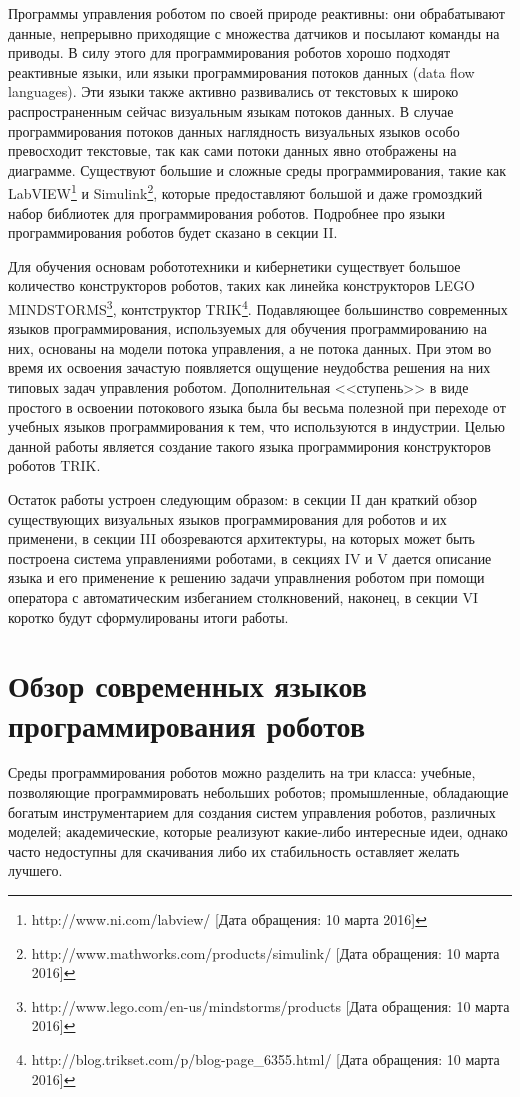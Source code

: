 \documentclass[conference]{IEEEtran}
\begin{document}
Программы управления роботом по своей природе реактивны: они обрабатывают данные, непрерывно  приходящие с множества датчиков и посылают команды на приводы. В силу этого для программирования роботов хорошо подходят реактивные языки, или языки программирования потоков данных (data flow languages). Эти языки также активно развивались от текстовых к широко распространенным сейчас визуальным языкам потоков данных\cite{johnston2004advances}. В случае программирования потоков данных наглядность визуальных языков особо превосходит текстовые, так как сами потоки данных явно отображены на диаграмме. Существуют большие и сложные среды программирования, такие как LabVIEW\footnote{http://www.ni.com/labview/ [Дата обращения: 10 марта 2016]} и Simulink\footnote{http://www.mathworks.com/products/simulink/ [Дата обращения: 10 марта 2016]}, которые предоставляют большой и даже громоздкий набор библиотек для программирования роботов. Подробнее про языки программирования роботов будет сказано в секции II.

Для обучения основам робототехники и кибернетики существует большое количество конструкторов роботов, таких как линейка конструкторов LEGO MINDSTORMS\footnote{http://www.lego.com/en-us/mindstorms/products [Дата обращения: 10 марта 2016]}, контструктор TRIK\footnote{http://blog.trikset.com/p/blog-page\_6355.html/ [Дата обращения: 10 марта 2016]}.
Подавляющее большинство современных языков программирования, используемых для обучения программированию на них, основаны на модели потока управления, а не потока данных. При этом во время их освоения зачастую появляется ощущение неудобства решения на них типовых задач управления роботом. Дополнительная <<ступень>> в виде простого в освоении потокового языка была бы весьма полезной при переходе от учебных языков программирования к тем, что используются в индустрии. Целью данной работы является создание такого языка программирония конструкторов роботов TRIK.


Остаток работы устроен следующим образом: в секции II дан краткий обзор существующих визуальных языков программирования для роботов и их применени, в секции III обозреваются архитектуры, на которых может быть построена система управлениями роботами, в секциях IV и V дается описание языка и его применение к решению задачи управлнения роботом при помощи оператора с автоматическим избеганием столкновений, наконец, в секции VI коротко будут сформулированы итоги работы. 

\section{Обзор современных языков программирования роботов}
Среды программирования роботов можно разделить на три класса: учебные, позволяющие программировать небольших роботов; промышленные, обладающие богатым инструментарием для создания систем управления роботов, различных моделей; академические, которые реализуют какие-либо интересные идеи, однако часто недоступны для скачивания либо их стабильность оставляет желать лучшего. 
\end{document}
